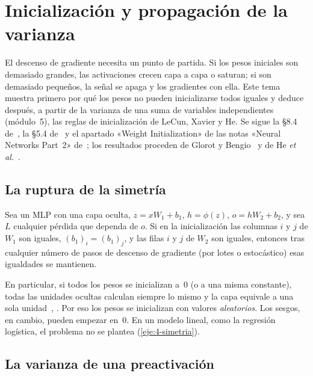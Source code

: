 \chapter{Inicialización y propagación de la varianza}
\label{tema:4}

El descenso de gradiente necesita un punto de partida. Si los pesos iniciales son demasiado grandes, las activaciones crecen capa a capa o saturan; si son demasiado pequeños, la señal se apaga y los gradientes con ella. Este tema muestra primero por qué los pesos no pueden inicializarse todos iguales y deduce después, a partir de la varianza de una suma de variables independientes (módulo~5), las reglas de inicialización de LeCun, Xavier y He. Se sigue la §8.4 de~\cite{gbc}, la §5.4 de~\cite{d2l} y el apartado «Weight Initialization» de las notas «Neural Networks Part~2» de~\cite{cs231n}; los resultados proceden de Glorot y Bengio~\cite{glorot} y de He \emph{et al.}~\cite{he}.

\section{La ruptura de la simetría}

\begin{proposicion}\label{prop:simetria}
Sea un MLP con una capa oculta, $z=xW_1+b_1$, $h=\phi(z)$, $o=hW_2+b_2$, y sea $L$ cualquier pérdida que dependa de $o$. Si en la inicialización las columnas $i$ y $j$ de $W_1$ son iguales, $(b_1)_i=(b_1)_j$, y las filas $i$ y $j$ de $W_2$ son iguales, entonces tras cualquier número de pasos de descenso de gradiente (por lotes o estocástico) esas igualdades se mantienen.
\end{proposicion}

En particular, si todos los pesos se inicializan a~0 (o a una misma constante), todas las unidades ocultas calculan siempre lo mismo y la capa equivale a una sola unidad~\cite{cs231n}, \cite[§5.4.1.3]{d2l}. Por eso los pesos se inicializan con valores \emph{aleatorios}. Los sesgos, en cambio, pueden empezar en~0. En un modelo lineal, como la regresión logística, el problema no se plantea (\cref{eje:4-simetria}).

\section{La varianza de una preactivación}

